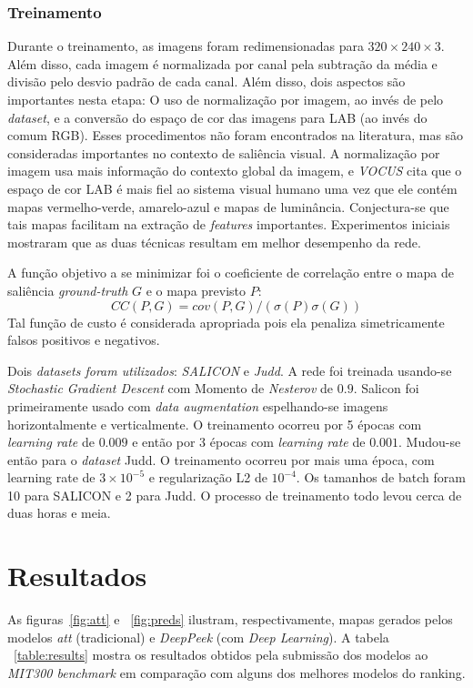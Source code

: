 \documentclass[11pt]{article}
\newcommand{\tit}[1]{\textit{#1}}
\begin{document}
\subsubsection{Treinamento}
Durante o treinamento, as imagens foram redimensionadas para
$320\times240\times3$.
Além disso, cada imagem é normalizada por canal pela subtração da média e
divisão pelo desvio padrão de cada canal.
Além disso, dois aspectos são importantes nesta etapa:
O uso de normalização por imagem, ao invés de pelo \tit{dataset}, e a
conversão do espaço de cor das imagens para LAB (ao invés do comum RGB).
Esses procedimentos não foram encontrados na literatura, mas são consideradas
importantes no contexto de saliência visual.
A normalização por imagem usa mais informação do contexto global da imagem, e
\emph{VOCUS} cita que o espaço de cor LAB é mais fiel ao sistema visual humano
uma vez que ele contém mapas vermelho-verde, amarelo-azul e mapas de
luminância.
Conjectura-se que tais mapas facilitam na extração de \tit{features}
importantes.
Experimentos iniciais mostraram que as duas técnicas resultam em melhor
desempenho da rede.

A função objetivo a se minimizar foi
o coeficiente de correlação entre o mapa de saliência \tit{ground-truth} $G$
e o mapa previsto $P$:
$$CC(P, G) = cov(P, G)/(\sigma(P)\sigma(G))$$
Tal função de custo é considerada apropriada pois ela penaliza simetricamente
falsos positivos e negativos.

Dois \tit{datasets foram utilizados}:
\emph{SALICON} e \emph{Judd}.
A rede foi treinada usando-se \tit{Stochastic Gradient Descent}
com Momento de \tit{Nesterov} de $0.9$.
Salicon foi primeiramente usado com \tit{data augmentation} espelhando-se
imagens horizontalmente e verticalmente.
O treinamento ocorreu por 5 épocas com \tit{learning rate} de $0.009$
e então por 3 épocas com \tit{learning rate} de $0.001$.
Mudou-se então para o \tit{dataset} Judd.
O treinamento ocorreu por mais uma época, com learning rate de
$3\times10^{-5}$ e regularização L2 de $10^{-4}$.
Os tamanhos de batch foram 10 para SALICON e 2 para Judd.
O processo de treinamento todo levou cerca de duas horas e meia.

\section{Resultados}
As figuras~\ref{fig:att} e ~\ref{fig:preds} ilustram, respectivamente,
mapas gerados pelos modelos \tit{att} (tradicional) e \tit{DeepPeek}
(com \tit{Deep Learning}).
A tabela ~\ref{table:results} mostra os resultados obtidos pela submissão
dos modelos ao \tit{MIT300 benchmark} em comparação com alguns dos melhores
modelos do ranking.
\end{document}
